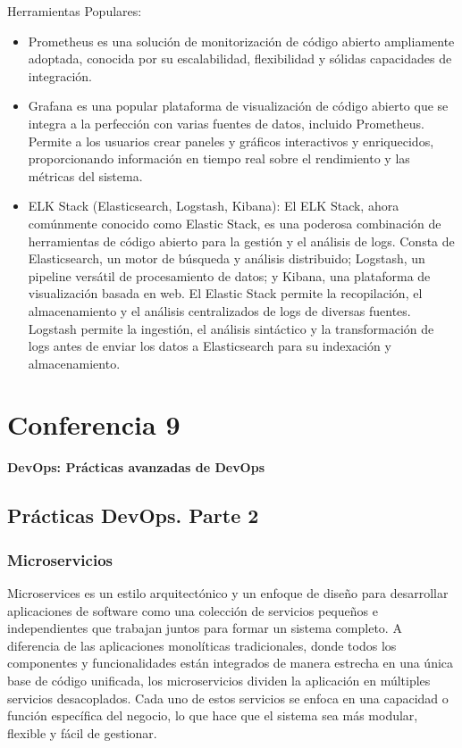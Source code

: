 \documentclass[12pt]{book}
\begin{document}
Herramientas Populares:
\begin{itemize}
    \item Prometheus es una solución de monitorización de código abierto ampliamente adoptada, conocida por su escalabilidad, flexibilidad y sólidas capacidades de integración.
    \item Grafana es una popular plataforma de visualización de código abierto que se integra a la perfección con varias fuentes de datos, incluido Prometheus. Permite a los usuarios crear paneles y gráficos interactivos y enriquecidos, proporcionando información en tiempo real sobre el rendimiento y las métricas del sistema.
    \item ELK Stack (Elasticsearch, Logstash, Kibana): El ELK Stack, ahora comúnmente conocido como Elastic Stack, es una poderosa combinación de herramientas de código abierto para la gestión y el análisis de logs. Consta de Elasticsearch, un motor de búsqueda y análisis distribuido; Logstash, un pipeline versátil de procesamiento de datos; y Kibana, una plataforma de visualización basada en web. El Elastic Stack permite la recopilación, el almacenamiento y el análisis centralizados de logs de diversas fuentes. Logstash permite la ingestión, el análisis sintáctico y la transformación de logs antes de enviar los datos a Elasticsearch para su indexación y almacenamiento.
\end{itemize}

\chapter{Conferencia 9}
\normalfont\LARGE \textbf{DevOps: Prácticas avanzadas de DevOps}
\normalfont\small\\

\section{Prácticas DevOps. Parte 2}
\subsection{Microservicios}

Microservices es un estilo arquitectónico y un enfoque de diseño para desarrollar aplicaciones de software como una colección de servicios pequeños e independientes que trabajan juntos para formar un sistema completo. A diferencia de las aplicaciones monolíticas tradicionales, donde todos los componentes y funcionalidades están integrados de manera estrecha en una única base de código unificada, los microservicios dividen la aplicación en múltiples servicios desacoplados. Cada uno de estos servicios se enfoca en una capacidad o función específica del negocio, lo que hace que el sistema sea más modular, flexible y fácil de gestionar.
\end{document}
